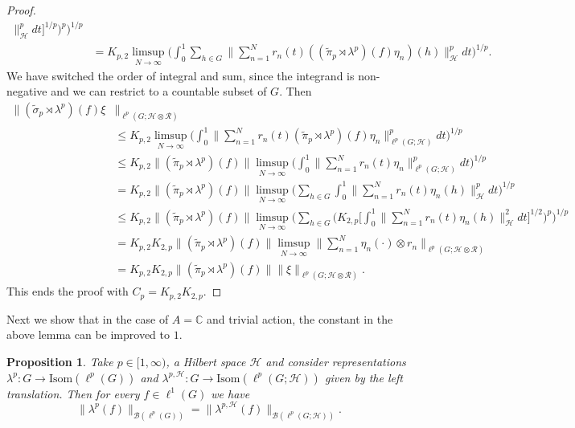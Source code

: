 \documentclass[12pt]{amsart}
\newtheorem{prop}[thm]{Proposition}
\theoremstyle{definition}
\theoremstyle{remark}
\numberwithin{equation}{section}
\newcommand{\C}{\mathbb{C}}
\newcommand{\mc}{\mathcal}
\newcommand{\wt}{\widetilde}
\newcommand{\md}{d}
\begin{document}
\begin{proof}
\begin{align*}
\bigr\|^p_{\mc{H}}
\md t
\bigr]^{1/p}\bigr)^{p}
\bigr)^{1/p}\\
&=
K_{p,2}
\limsup_{N\to\infty}
\bigl(
\int_{0}^{1}
\sum_{h\in G}
\bigl\|
\sum_{n=1}^{N} r_n(t)
((\wt{\pi}_p\rtimes\lambda^p)(f)\eta_n)(h) \bigr\|^p_{\mc{H}}
\md t
\bigr)^{1/p}.
\end{align*}
We have switched the order of integral and sum, since the integrand is non-negative and we can restrict to a countable subset of $G$. Then
\begin{align*}
\|(\wt{\sigma}_p\rtimes\lambda^p)(f) \xi&\|_{\ell^p(G;\mc{H}\otimes \mc{R})}\\
&\le
K_{p,2}
\limsup_{N\to\infty}
\bigl(
\int_{0}^{1}
\bigl\|
\sum_{n=1}^{N} r_n(t)
(\wt{\pi}_p\rtimes\lambda^p)(f)\eta_n \bigr\|^p_{\ell^p(G;\mc{H})}
\md t
\bigr)^{1/p}\\
&\le
K_{p,2}
\|(\wt{\pi}_p\rtimes\lambda^p)(f)\|
\limsup_{N\to\infty}
\bigl(
\int_{0}^{1}
\bigl\|
\sum_{n=1}^{N} r_n(t)
 \eta_n \bigr\|^p_{\ell^p(G;\mc{H})}
\md t
\bigr)^{1/p}\\
&=
K_{p,2}
\|(\wt{\pi}_p\rtimes\lambda^p)(f)\|
\limsup_{N\to\infty}
\bigl(
\sum_{h\in G}
\int_{0}^{1}
\bigl\|
\sum_{n=1}^{N} r_n(t)
 \eta_n(h) \bigr\|^p_{ \mc{H}}
\md t
\bigr)^{1/p}\\
&\le
K_{p,2}
\|(\wt{\pi}_p\rtimes\lambda^p)(f)\|
\limsup_{N\to\infty}
\bigl(
\sum_{h\in G}
\bigl(
K_{2,p}\bigl[\int_{0}^{1}
\bigl\|
\sum_{n=1}^{N} r_n(t)
 \eta_n(h) \bigr\|^2_{ \mc{H}}
\md t\bigr]^{1/2}\bigr)^{p}
\bigr)^{1/p}\\
&=
K_{p,2} K_{2,p}
\|(\wt{\pi}_p\rtimes\lambda^p)(f)\|
\limsup_{N\to\infty}
\bigl\|
\sum_{n=1}^{N}
 \eta_n(\cdot)\otimes r_n \bigr\|_{\ell^p(G; \mc{H}\otimes \mc{R})}\\
 &=
K_{p,2} K_{2,p}
\|(\wt{\pi}_p\rtimes\lambda^p)(f)\|
\|
\xi \|_{\ell^p(G; \mc{H}\otimes \mc{R})}.
\end{align*}
This ends the proof with $C_p=K_{p,2} K_{2,p}$.
\end{proof}

Next we show that in the case of $A=\C$ and trivial action, the constant in the above lemma can be improved to $1$.

\begin{prop} \label{prop:isometry}
Take $p\in[1, \infty)$, a Hilbert space $\mathcal{H}$ and consider representations $\lambda^p\colon G\rightarrow  \mbox{Isom}( \ell^p(G))$ and $\lambda^{p,\mc{H}}\colon  G\rightarrow \mbox{Isom}(\ell^p(G;\mc{H}))$ given by the left translation. Then for every  $f\in \ell^1(G)$ we have
\[
\|\lambda^p(f)\|_{\mc{B}(\ell^p(G))}=
\|\lambda^{p,\mc{H}}(f)\|_{\mc{B}(\ell^p(G;\mc{H}))}.
\]
\end{prop}
\end{document}
